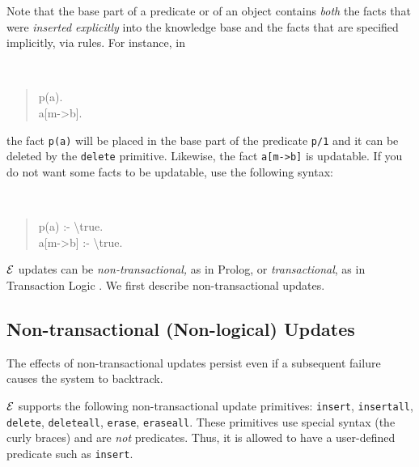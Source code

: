 \documentclass[11pt]{article}
\newcommand{\ERGO}{\mbox{\ensuremath{\cal{E}}\smaller{{\sc{RGO}}}}\xspace}
\newcommand{\FLSYSTEM}{\ERGO}
\newcommand{\bs}{\textbackslash}
\begin{document}
Note that the base part of a predicate or of an object contains \emph{both}
the facts that were \emph{inserted explicitly} into the knowledge base and the
facts that are specified implicitly, via rules. For instance, in
{\tt
\begin{quote}
 p(a).\\
 a[m->b].
\end{quote}
}
\noindent
the fact {\tt p(a)} will be placed in the base part of the
predicate {\tt p/1}  and it can be deleted by the {\tt delete}
primitive. Likewise, the fact {\tt a[m->b]} is updatable. If you do not
want some facts to be updatable, use the following syntax:
{\tt
\begin{quote}
 p(a) :- \bs{}true.\\
 a[m->b] :- \bs{}true.
\end{quote}
}


\FLSYSTEM updates can be \emph{non-transactional,} as in Prolog, or
\emph{transactional}, as in Transaction Logic
\cite{trans-chapter-98,trans-tcs94}.  We first describe non-transactional
updates.


\subsection{Non-transactional (Non-logical) Updates}
\label{sec:non-transactional-updates}

%
The effects of non-transactional updates persist even if a subsequent failure
causes the system to backtrack.

\FLSYSTEM supports the following non-transactional update primitives:
{\tt insert}, {\tt insertall}, {\tt delete}, {\tt deleteall},
{\tt erase}, {\tt eraseall}. These primitives use special syntax (the curly
braces) and are \emph{not} predicates. Thus, it is allowed to have a
user-defined predicate such as {\tt insert}.

%
\end{document}

